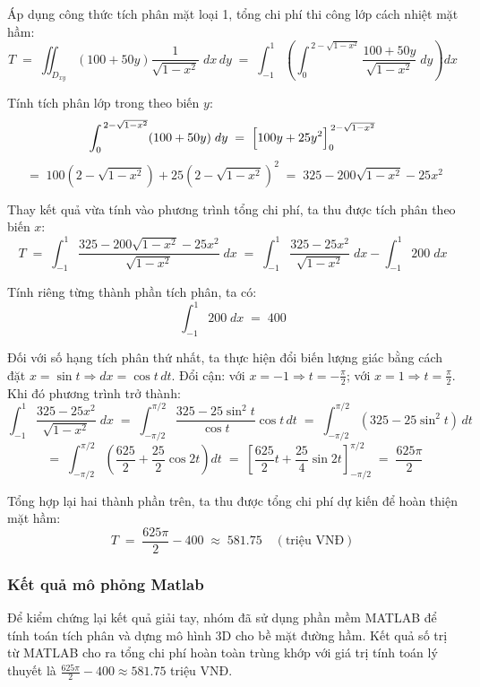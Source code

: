 Áp dụng công thức tích phân mặt loại 1, tổng chi phí thi công lớp cách nhiệt mặt hầm:
\begin{equation}
	T
	\;=\; \iint_{D_{xy}} (100 + 50y) \frac{1}{\sqrt{1-x^2}}\; dx\,dy
	\;=\; \int_{-1}^{1} \left( \int_{0}^{\,2-\sqrt{1-x^2}} \frac{100 + 50y}{\sqrt{1-x^2}}\; dy \right) dx
\end{equation}

Tính tích phân lớp trong theo biến $y$:
\begin{equation}
	\int_{0}^{\,2-\sqrt{1-x^2}} (100 + 50y)\; dy 
	\;=\; \Bigl[100y + 25y^2\Bigr]_{0}^{\,2-\sqrt{1-x^2}}
\end{equation}
\[
\;=\; 100\left(2 - \sqrt{1-x^2}\right) + 25\left(2 - \sqrt{1-x^2}\right)^2
\;=\; 325 - 200\sqrt{1-x^2} - 25x^2
\]

Thay kết quả vừa tính vào phương trình tổng chi phí, ta thu được tích phân theo biến $x$:
\begin{equation}
	T
	\;=\; \int_{-1}^{1} \frac{325 - 200\sqrt{1-x^2} - 25x^2}{\sqrt{1-x^2}}\; dx
	\;=\; \int_{-1}^{1} \frac{325 - 25x^2}{\sqrt{1-x^2}}\; dx - \int_{-1}^{1} 200\; dx
\end{equation}

Tính riêng từng thành phần tích phân, ta có:
\[
\int_{-1}^{1} 200\; dx \;=\; 400
\]

Đối với số hạng tích phân thứ nhất, ta thực hiện đổi biến lượng giác bằng cách đặt $x = \sin t \Rightarrow dx = \cos t\,dt$. 
Đổi cận: với $x = -1 \Rightarrow t = -\frac{\pi}{2}$; với $x = 1 \Rightarrow t = \frac{\pi}{2}$. Khi đó phương trình trở thành:
\begin{equation}
	\int_{-1}^{1} \frac{325 - 25x^2}{\sqrt{1-x^2}}\; dx
	\;=\; \int_{-\pi/2}^{\pi/2} \frac{325 - 25\sin^2 t}{\cos t} \cos t\,dt
	\;=\; \int_{-\pi/2}^{\pi/2} (325 - 25\sin^2 t)\,dt
\end{equation}
\begin{equation}
	\;=\; \int_{-\pi/2}^{\pi/2} \left( \frac{625}{2} + \frac{25}{2}\cos 2t \right) dt
	\;=\; \left[ \frac{625}{2}t + \frac{25}{4}\sin 2t \right]_{-\pi/2}^{\pi/2}
	\;=\; \frac{625\pi}{2}
\end{equation}

Tổng hợp lại hai thành phần trên, ta thu được tổng chi phí dự kiến để hoàn thiện mặt hầm:
\[
T
\;=\; \frac{625\pi}{2} - 400
\;\approx\; \boxed{581.75} \quad (\text{triệu VNĐ})
\]

\subsubsection{Kết quả mô phỏng Matlab}
Để kiểm chứng lại kết quả giải tay, nhóm đã sử dụng phần mềm MATLAB để tính toán tích phân và dựng mô hình 3D cho bề mặt đường hầm. Kết quả số trị từ MATLAB cho ra tổng chi phí hoàn toàn trùng khớp với giá trị tính toán lý thuyết là $\frac{625\pi}{2} - 400 \approx 581.75$ triệu VNĐ.

